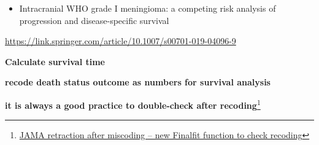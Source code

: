 \documentclass[
]{article}
\newenvironment{Shaded}{\begin{snugshade}}{\end{snugshade}}
\newcommand{\CommentTok}[1]{\textcolor[rgb]{0.54,0.53,0.53}{#1}}
\newcommand{\DataTypeTok}[1]{\textcolor[rgb]{0.00,0.34,0.68}{#1}}
\newcommand{\DecValTok}[1]{\textcolor[rgb]{0.69,0.50,0.00}{#1}}
\newcommand{\KeywordTok}[1]{\textcolor[rgb]{0.12,0.11,0.11}{\textbf{#1}}}
\newcommand{\NormalTok}[1]{\textcolor[rgb]{0.12,0.11,0.11}{#1}}
\newcommand{\OperatorTok}[1]{\textcolor[rgb]{0.12,0.11,0.11}{#1}}
\newcommand{\StringTok}[1]{\textcolor[rgb]{0.75,0.01,0.01}{#1}}
\providecommand{\tightlist}{%
  \setlength{\itemsep}{0pt}\setlength{\parskip}{0pt}}
\begin{document}
\begin{landscape}
\begin{itemize}
\tightlist
\item
  Intracranial WHO grade I meningioma: a competing risk analysis of
  progression and disease-specific survival
\end{itemize}

\url{https://link.springer.com/article/10.1007/s00701-019-04096-9}

\textbf{Calculate survival time}

\begin{Shaded}
\end{Shaded}

\textbf{recode death status outcome as numbers for survival analysis}

\begin{Shaded}
\end{Shaded}

\textbf{it is always a good practice to double-check after
recoding}\footnote{\href{https://www.datasurg.net/2019/10/15/jama-retraction-after-miscoding-new-finalfit-function-to-check-recoding/}{JAMA
  retraction after miscoding -- new Finalfit function to check recoding}}


\end{landscape}
\end{document}
